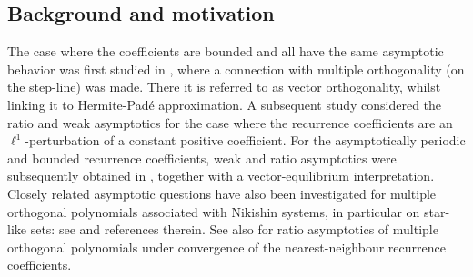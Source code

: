 \documentclass[12pt]{article}
\numberwithin{equation}{section}
\begin{document}
\subsection{Background and motivation}

The case where the coefficients are  bounded and all have the same asymptotic behavior was first studied in  \cite{AKVI}, where a connection with multiple orthogonality (on the step-line) was made. There it is referred to as vector orthogonality, whilst linking it to Hermite-Pad\'e approximation. A subsequent study \cite{AKS} considered the ratio and weak asymptotics for the case where the recurrence coefficients are an $\ell^{1}$-perturbation of a constant positive coefficient. For the asymptotically periodic and  bounded recurrence coefficients, weak and ratio asymptotics were subsequently obtained in \cite{DelLop}, together with a vector-equilibrium interpretation. Closely related asymptotic questions have also been investigated for multiple orthogonal  polynomials associated with Nikishin systems, in particular on star-like sets: see \cite{DelLop,LGLL1,LGMD} and  references therein. See also \cite{WVA} for ratio asymptotics of multiple orthogonal  polynomials under convergence of the nearest-neighbour recurrence coefficients. 
\end{document}
